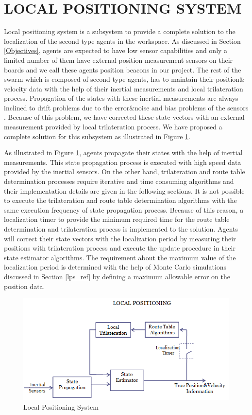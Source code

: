 \section{LOCAL POSITIONING SYSTEM} \label{LOCAL POSITIONING SYSTEMS_ref}
Local positioning system is a subsystem to provide a complete solution to the localization of the second type agents in the workspace. As discussed in Section \ref{Objectives}, agents are expected to have low sensor capabilities and only a limited number of them have external position measurement sensors on their boards and we call these agents position beacons in our project. The rest of the swarm which is composed of second type agents, has to maintain their position$\&$velocity data with the help of their inertial measurements and local trilateration process. Propagation of the states with these inertial measurements are always inclined to drift problems due to the error$\&$noise and bias problems of the sensors \cite{91}. Because of this problem, we have corrected these state vectors with an external measurement provided by local trilateration process. We have proposed a complete solution for this subsystem as illustrated in Figure \ref{figure_lps}.

As illustrated in Figure \ref{figure_lps}, agents propagate their states with the help of inertial measurements. This state propagation process is executed with high speed data provided by the inertial sensors. On the other hand, trilateration and route table determination processes require iterative and time consuming algorithms and their implementation details are given in the following sections. It is not possible to execute the trilateration and route table determination algorithms with the same execution frequency of state propagation process. Because of this reason, a localization timer to provide the minimum required time for the route table determination and trilateration process is implemented to the solution. Agents will correct their state vectors with the localization period by measuring their positions with trilateration process and execute the update procedure in their state estimator algorithms. The requirement about the maximum value of the localization period is determined with the help of Monte Carlo simulations discussed in Section \ref{lps_ref} by defining a maximum allowable error on the position data. 

\begin{figure}[H]
\caption{Local Positioning System} \label{figure_lps}
\centering
\includegraphics[scale = 0.60]{lps}
\end{figure}

